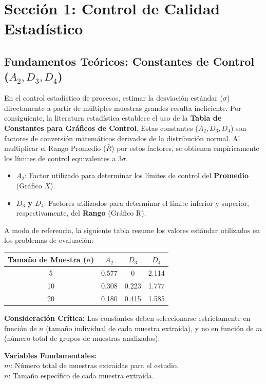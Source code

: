 \section{Sección 1: Control de Calidad Estadístico}

\subsection{Fundamentos Teóricos: Constantes de Control ($A_2, D_3, D_4$)}
En el control estadístico de procesos, estimar la desviación estándar ($\sigma$) directamente a partir de múltiples muestras grandes resulta ineficiente. Por consiguiente, la literatura estadística establece el uso de la \textbf{Tabla de Constantes para Gráficos de Control}.
Estas constantes ($A_2, D_3, D_4$) son factores de conversión matemáticos derivados de la distribución normal. Al multiplicar el Rango Promedio ($\bar{R}$) por estos factores, se obtienen empíricamente los límites de control equivalentes a $3\sigma$.
\begin{itemize}
    \item \textbf{$A_2$}: Factor utilizado para determinar los límites de control del \textbf{Promedio} (Gráfico $\bar{X}$).
    \item \textbf{$D_3$ y $D_4$}: Factores utilizados para determinar el límite inferior y superior, respectivamente, del \textbf{Rango} (Gráfico R).
\end{itemize}

A modo de referencia, la siguiente tabla resume los valores estándar utilizados en los problemas de evaluación:
\begin{center}
\begin{tabular}{cccc}
\toprule
\textbf{Tamaño de Muestra ($n$)} & \textbf{$A_2$} & \textbf{$D_3$} & \textbf{$D_4$} \\
\midrule
5 & 0.577 & 0 & 2.114 \\
10 & 0.308 & 0.223 & 1.777 \\
20 & 0.180 & 0.415 & 1.585 \\
\bottomrule
\end{tabular}
\end{center}

\textbf{Consideración Crítica:} Las constantes deben seleccionarse estrictamente en función de $n$ (tamaño individual de cada muestra extraída), y no en función de $m$ (número total de grupos de muestras analizados).

\begin{tcolorbox}[colback=blue!5!white,colframe=blue!60!black,title=Parámetros del Modelo]
\textbf{Variables Fundamentales:}\\
$m$: Número total de muestras extraídas para el estudio.\\
$n$: Tamaño específico de cada muestra extraída.
\end{tcolorbox}

